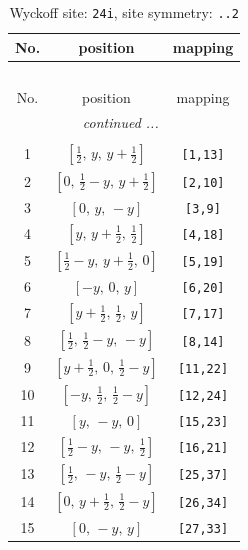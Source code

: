\documentclass[fleqn,8pt]{jsarticle}
\begin{document}
\begin{longtable}{ccc}
\caption{Wyckoff site: {\tt 24i}, site symmetry: {\tt ..2}}
 \\
 \hline \hline
No. & position & mapping \\ \hline \endfirsthead

\multicolumn{2}{l}{\tablename\ \thetable{}} \\
 \hline \hline
No. & position & mapping \\ \hline \endhead

 \hline \hline
\multicolumn{2}{r}{\footnotesize\it continued ...} \\ \endfoot

 \hline \hline
\multicolumn{2}{r}{} \\ \endlastfoot

1 & $\left[ \frac{1}{2},\, y,\, y + \frac{1}{2} \right]$ & {\tt [1,13]} \\ \hline
2 & $\left[ 0,\, \frac{1}{2} - y,\, y + \frac{1}{2} \right]$ & {\tt [2,10]} \\ \hline
3 & $\left[ 0,\, y,\, - y \right]$ & {\tt [3,9]} \\ \hline
4 & $\left[ y,\, y + \frac{1}{2},\, \frac{1}{2} \right]$ & {\tt [4,18]} \\ \hline
5 & $\left[ \frac{1}{2} - y,\, y + \frac{1}{2},\, 0 \right]$ & {\tt [5,19]} \\ \hline
6 & $\left[ - y,\, 0,\, y \right]$ & {\tt [6,20]} \\ \hline
7 & $\left[ y + \frac{1}{2},\, \frac{1}{2},\, y \right]$ & {\tt [7,17]} \\ \hline
8 & $\left[ \frac{1}{2},\, \frac{1}{2} - y,\, - y \right]$ & {\tt [8,14]} \\ \hline
9 & $\left[ y + \frac{1}{2},\, 0,\, \frac{1}{2} - y \right]$ & {\tt [11,22]} \\ \hline
10 & $\left[ - y,\, \frac{1}{2},\, \frac{1}{2} - y \right]$ & {\tt [12,24]} \\ \hline
11 & $\left[ y,\, - y,\, 0 \right]$ & {\tt [15,23]} \\ \hline
12 & $\left[ \frac{1}{2} - y,\, - y,\, \frac{1}{2} \right]$ & {\tt [16,21]} \\ \hline
13 & $\left[ \frac{1}{2},\, - y,\, \frac{1}{2} - y \right]$ & {\tt [25,37]} \\ \hline
14 & $\left[ 0,\, y + \frac{1}{2},\, \frac{1}{2} - y \right]$ & {\tt [26,34]} \\ \hline
15 & $\left[ 0,\, - y,\, y \right]$ & {\tt [27,33]} \\ \hline

\end{longtable}
\end{document}
